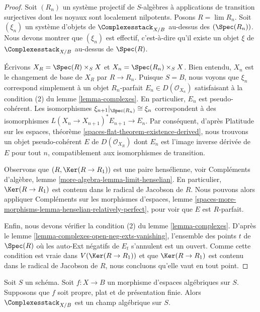 \begin{proof}
Soit $(R_n)$ un système projectif de $S$-algèbres à applications de transition
surjectives dont les noyaux sont localement nilpotents. Posons
$R = \lim R_n$. Soit $(\xi_n)$ un système d'objets de
$\Complexesstack_{X/B}$ au-dessus des $(\Spec(R_n))$. Nous devons montrer que
$(\xi_n)$ est effectif, c'est-à-dire qu'il existe un objet $\xi$ de
$\Complexesstack_{X/B}$ au-dessus de $\Spec(R)$.

\medskip\noindent
Écrivons $X_R = \Spec(R) \times_S X$ et
$X_n = \Spec(R_n) \times_S X$.
Bien entendu, $X_n$ est le changement de base de $X_R$ par $R \to R_n$.
Puisque $S = B$, nous voyons que $\xi_n$ correspond simplement à un objet
$R_n$-parfait $E_n \in D(\mathcal{O}_{X_n})$ satisfaisant à la condition (2)
du lemme \ref{lemma-complexes}. En particulier, $E_n$ est pseudo-cohérent.
Les isomorphismes
$\xi_{n + 1}|_{\Spec(R_n)} \cong \xi_n$ correspondent à des isomorphismes
$L(X_n \to X_{n + 1})^*E_{n + 1} \to E_n$.
Par conséquent, d'après Platitude sur les espaces, théorème
\ref{spaces-flat-theorem-existence-derived}, nous trouvons un objet
pseudo-cohérent $E$ de $D(\mathcal{O}_{X_R})$ dont $E_n$ est l'image inverse
dérivée de $E$ pour tout $n$, compatiblement aux isomorphismes de transition.

\medskip\noindent
Observons que $(R, \Ker(R \to R_1))$ est une paire hensélienne, voir
Compléments d'algèbre, lemme \ref{more-algebra-lemma-limit-henselian}.
En particulier, $\Ker(R \to R_1)$ est contenu dans le radical de Jacobson de
$R$. Nous pouvons alors appliquer
Compléments sur les morphismes d'espaces, lemme
\ref{spaces-more-morphisms-lemma-henselian-relatively-perfect},
pour voir que $E$ est $R$-parfait.

\medskip\noindent
Enfin, nous devons vérifier la condition (2) du lemme \ref{lemma-complexes}.
D'après le lemme \ref{lemma-complexes-open-neg-exts-vanishing}, l'ensemble des
points $t$ de $\Spec(R)$ où les auto-Ext négatifs de $E_t$ s'annulent est un
ouvert. Comme cette condition est vraie dans $V(\Ker(R \to R_1))$ et que
$\Ker(R \to R_1)$ est contenu dans le radical de Jacobson de $R$, nous
concluons qu'elle vaut en tout point.
\end{proof}

\begin{theorem}
\label{theorem-complexes-algebraic}
\begin{reference}
\cite{lieblich-complexes}
\end{reference}
Soit $S$ un schéma. Soit $f : X \to B$ un morphisme d'espaces algébriques
sur $S$. Supposons que $f$ soit propre, plat et de présentation finie.
Alors $\Complexesstack_{X/B}$ est un champ algébrique sur $S$.
\end{theorem}

